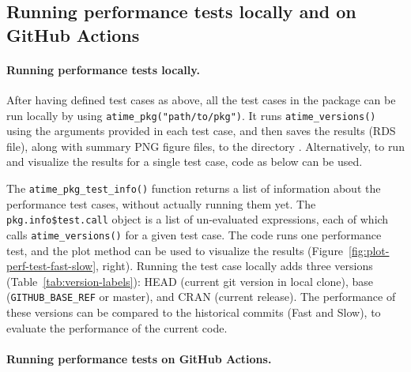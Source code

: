 \subsection{Running performance tests locally and on GitHub Actions}


\paragraph{Running performance tests locally.}
After having defined test cases as above, all the test cases in the package can be run locally by using \verb|atime_pkg("path/to/pkg")|.
It runs \verb|atime_versions()| using the arguments provided in each test case, and then saves the results (RDS file), along with summary PNG figure files, to the directory .
Alternatively, to run and visualize the results for a single test case, code as below can be used.
\begin{Schunk}
\end{Schunk}
The \verb|atime_pkg_test_info()| function returns a list of information about the performance test cases, without actually running them yet.
The \verb|pkg.info$test.call| object is a list of un-evaluated expressions, each of which calls \verb|atime_versions()| for a given test case.
The code  runs one performance test, and the plot method can be used to visualize the results (Figure~\ref{fig:plot-perf-test-fast-slow}, right).
Running the test case locally adds three versions (Table~\ref{tab:version-labels}): HEAD (current git version in local clone), base (\verb|GITHUB_BASE_REF| or master), and CRAN (current release).
The performance of these versions can be compared to the historical commits (Fast and Slow), to evaluate the performance of the current code.

\paragraph{Running performance tests on GitHub Actions.}

